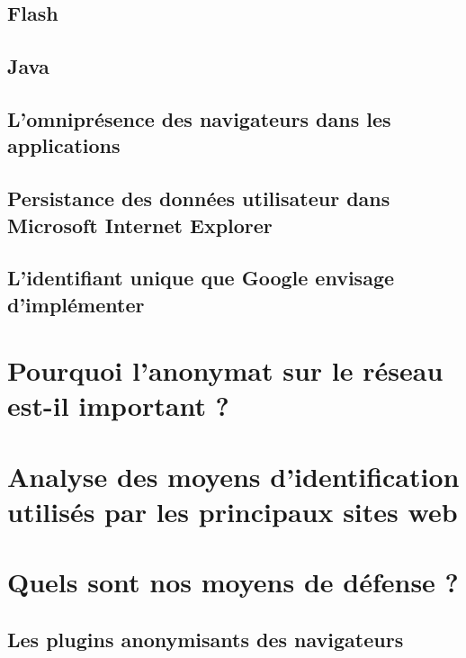 \documentclass[a4paper,12pt,french]{report}
\begin{document}
	\section{Flash}
	
	\section{Java}
	
	\section{L'omniprésence des navigateurs dans les applications}
		
	\section{Persistance des données utilisateur dans Microsoft Internet Explorer}
		
	\section{L'identifiant unique que Google envisage d'implémenter}
		
\chapter{Pourquoi l'anonymat sur le réseau est-il important ?}

\chapter{Analyse des moyens d'identification utilisés par les principaux sites web}
	
\chapter{Quels sont nos moyens de défense ?}
	\section{Les plugins anonymisants des navigateurs}
		
\end{document}
